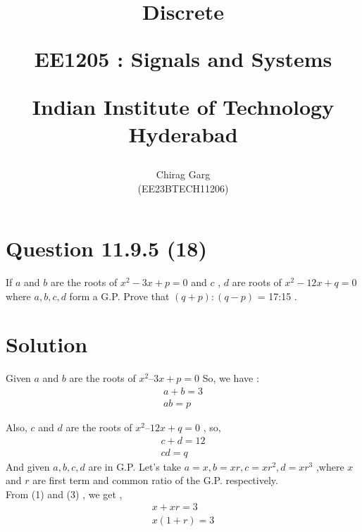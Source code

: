 \documentclass[journal,12pt,twocolumn]{IEEEtran}
\theoremstyle{remark}
\begin{document}
%




\vspace{3cm}

\title{
Discrete

\large{EE1205 : Signals and Systems}

Indian Institute of Technology Hyderabad
}
\author{Chirag Garg

(EE23BTECH11206)
}	





\maketitle

\newpage



\bigskip

\renewcommand{\thefigure}{\theenumi}
\renewcommand{\thetable}{\theenumi}


\section{Question 11.9.5 (18)}
\vspace{0.5cm}
\begin{flushleft}
If $a$ and $b$ are the roots of $x^{2} -3x + p = 0$ and $c$ , $d$ are roots of $x^{2} - 12x + q = 0$ where $a,b,c,d$ form a G.P. Prove that $(q+p) : (q-p)$ = 17:15 .
\end{flushleft}  


\vspace{0.8cm}


\section{Solution} 
\begin{flushleft}
\end{flushleft}
Given $a$ and $b$ are the roots of $x^{2} – 3x + p = 0$
So, we have :
\begin{align}
a + b = 3\\
 ab = p 
\end{align}

Also, $c$ and $d$ are the roots of $x^{2} – 12x + q = 0$ , so,
\begin{align}
c + d = 12 \\
cd = q
 \end{align}  
And given $a, b, c, d$ are in G.P.
Let’s take $a = x, b = xr, c = xr^{2}, d = xr^{3}$ ,where $x$ and $r$ are first term and common ratio of the G.P. respectively.\\
From (1) and (3) , we get , 
\begin{align}
x + xr = 3 \\
x(1+r)=3
\end{align}
 
\end{document}
